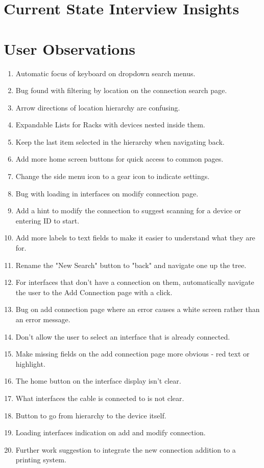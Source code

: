\documentclass [11pt,a4paper]{article}
\begin{document}
\section{Current State Interview Insights}
\label{sec:current_state_interview_takeaways}


\section{User Observations }
\label{sec:appendix_observations}
\begin{enumerate}
    \item Automatic focus of keyboard on dropdown search menus.
    \item Bug found with filtering by location on the connection search page.
    \item Arrow directions of location hierarchy are confusing.
    \item Expandable Lists for Racks with devices nested inside them.
    \item Keep the last item selected in the hierarchy when navigating back.
    \item Add more home screen buttons for quick access to common pages.
    \item Change the side menu icon to a gear icon to indicate settings.
    \item Bug with loading in interfaces on modify connection page.
    \item Add a hint to modify the connection to suggest scanning for a device or entering ID to start.
    \item Add more labels to text fields to make it easier to understand what they are for.
    \item Rename the "New Search" button to "back" and navigate one up the tree. 
    \item For interfaces that don't have a connection on them, automatically navigate the user to the Add Connection page with a click.
    \item Bug on add connection page where an error causes a white screen rather than an error message.
    \item Don't allow the user to select an interface that is already connected.
    \item Make missing fields on the add connection page more obvious - red text or highlight.
    \item The home button on the interface display isn't clear. 
    \item What interfaces the cable is connected to is not clear.
    \item Button to go from hierarchy to the device itself.
    \item Loading interfaces indication on add and modify connection.
    \item Further work suggestion to integrate the new connection addition to a printing system.
\end{enumerate}
\end{document}
